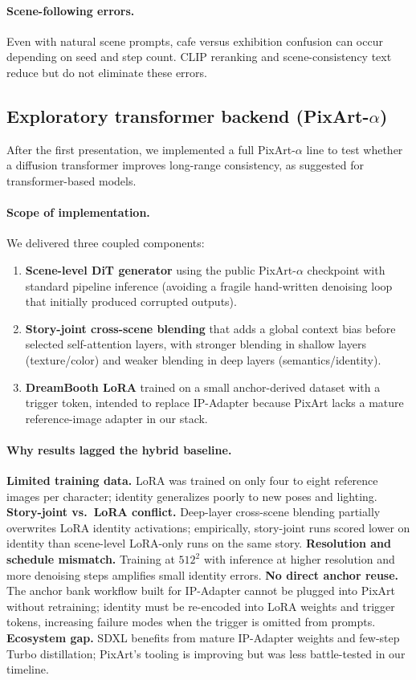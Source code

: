 \paragraph{Scene-following errors.}
Even with natural scene prompts, cafe versus exhibition confusion can occur depending on seed and step count.
CLIP reranking and scene-consistency text reduce but do not eliminate these errors.

\subsection{Exploratory transformer backend (PixArt-$\alpha$)}
\label{sec:dit_discussion}

After the first presentation, we implemented a full PixArt-$\alpha$ line to test whether a diffusion transformer improves long-range consistency, as suggested for transformer-based models.

\paragraph{Scope of implementation.}
We delivered three coupled components:
\begin{enumerate}
  \item \textbf{Scene-level DiT generator} using the public PixArt-$\alpha$ checkpoint with standard pipeline inference (avoiding a fragile hand-written denoising loop that initially produced corrupted outputs).
  \item \textbf{Story-joint cross-scene blending} that adds a global context bias before selected self-attention layers, with stronger blending in shallow layers (texture/color) and weaker blending in deep layers (semantics/identity).
  \item \textbf{DreamBooth LoRA} trained on a small anchor-derived dataset with a trigger token, intended to replace IP-Adapter because PixArt lacks a mature reference-image adapter in our stack.
\end{enumerate}

\paragraph{Why results lagged the hybrid baseline.}
\textbf{Limited training data.} LoRA was trained on only four to eight reference images per character; identity generalizes poorly to new poses and lighting.
\textbf{Story-joint vs.\ LoRA conflict.} Deep-layer cross-scene blending partially overwrites LoRA identity activations; empirically, story-joint runs scored lower on identity than scene-level LoRA-only runs on the same story.
\textbf{Resolution and schedule mismatch.} Training at $512^2$ with inference at higher resolution and more denoising steps amplifies small identity errors.
\textbf{No direct anchor reuse.} The anchor bank workflow built for IP-Adapter cannot be plugged into PixArt without retraining; identity must be re-encoded into LoRA weights and trigger tokens, increasing failure modes when the trigger is omitted from prompts.
\textbf{Ecosystem gap.} SDXL benefits from mature IP-Adapter weights and few-step Turbo distillation; PixArt's tooling is improving but was less battle-tested in our timeline.

